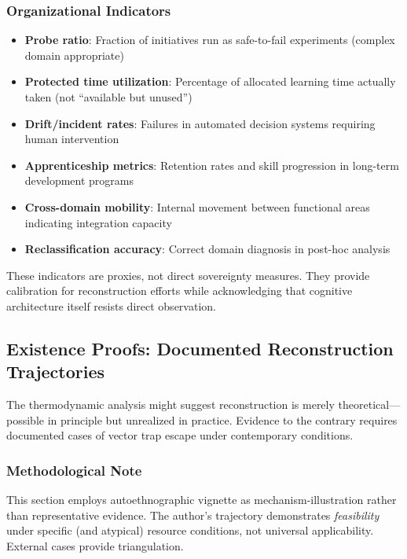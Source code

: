 \subsubsection{Organizational Indicators}

\begin{itemize}
\item \textbf{Probe ratio}: Fraction of initiatives run as safe-to-fail experiments (complex domain appropriate)
\item \textbf{Protected time utilization}: Percentage of allocated learning time actually taken (not ``available but unused'')
\item \textbf{Drift/incident rates}: Failures in automated decision systems requiring human intervention
\item \textbf{Apprenticeship metrics}: Retention rates and skill progression in long-term development programs
\item \textbf{Cross-domain mobility}: Internal movement between functional areas indicating integration capacity
\item \textbf{Reclassification accuracy}: Correct domain diagnosis in post-hoc analysis
\end{itemize}

These indicators are proxies, not direct sovereignty measures. They provide calibration for reconstruction efforts while acknowledging that cognitive architecture itself resists direct observation.

\subsection{Existence Proofs: Documented Reconstruction Trajectories}
\label{sec:existence-proof}

The thermodynamic analysis might suggest reconstruction is merely theoretical---possible in principle but unrealized in practice. Evidence to the contrary requires documented cases of vector trap escape under contemporary conditions.

\subsubsection{Methodological Note}

This section employs autoethnographic vignette as mechanism-illustration rather than representative evidence. The author's trajectory demonstrates \textit{feasibility} under specific (and atypical) resource conditions, not universal applicability. External cases provide triangulation.

